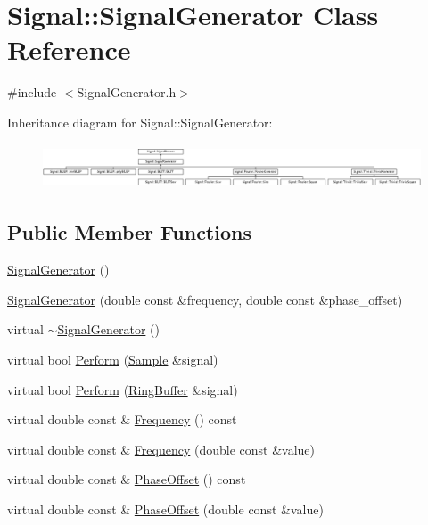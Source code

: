 \hypertarget{classSignal_1_1SignalGenerator}{\section{Signal\+:\+:Signal\+Generator Class Reference}
\label{classSignal_1_1SignalGenerator}
}


{\ttfamily \#include $<$Signal\+Generator.\+h$>$}

Inheritance diagram for Signal\+:\+:Signal\+Generator\+:\begin{figure}[H]
\begin{center}
\leavevmode
\includegraphics[height=1.346154cm]{classSignal_1_1SignalGenerator}
\end{center}
\end{figure}
\subsection*{Public Member Functions}
\begin{DoxyCompactItemize}
\item 
\hyperlink{classSignal_1_1SignalGenerator_a8c67c754d86e0363445d7fd271855e1a}{Signal\+Generator} ()
\item 
\hyperlink{classSignal_1_1SignalGenerator_a0a09e58b391b2e65af370bbf266b888c}{Signal\+Generator} (double const \&frequency, double const \&phase\+\_\+offset)
\item 
virtual \hyperlink{classSignal_1_1SignalGenerator_a2c0cb5fa941326bc206f45a07aa872ef}{$\sim$\+Signal\+Generator} ()
\item 
virtual bool \hyperlink{classSignal_1_1SignalGenerator_a2cd9061c5ae40a392a9476551b4379f3}{Perform} (\hyperlink{classSignal_1_1Sample}{Sample} \&signal)
\item 
virtual bool \hyperlink{classSignal_1_1SignalGenerator_a126d52dd9b6b14d33efc624e2c89284e}{Perform} (\hyperlink{classSignal_1_1RingBuffer}{Ring\+Buffer} \&signal)
\item 
virtual double const \& \hyperlink{classSignal_1_1SignalGenerator_a96af42ee68f94e9b04d034fd68b73ecd}{Frequency} () const 
\item 
virtual double const \& \hyperlink{classSignal_1_1SignalGenerator_af83b532bf3ddc3637c2fd7a1dfd095cb}{Frequency} (double const \&value)
\item 
virtual double const \& \hyperlink{classSignal_1_1SignalGenerator_ac2538ec946f001e394d2416fda698d1c}{Phase\+Offset} () const 
\item 
virtual double const \& \hyperlink{classSignal_1_1SignalGenerator_ac6a103ff72beaa338f6d18c812522d78}{Phase\+Offset} (double const \&value)
\end{DoxyCompactItemize}
